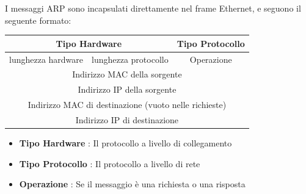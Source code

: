 \documentclass[12pt, letterpaper]{article}
\begin{document}
I messaggi ARP sono incapsulati direttamente nel frame Ethernet, e seguono il seguente formato: \begin{center}
    \begin{tabular}{|ccc|}
        \hline
        \multicolumn{2}{|c|}{Tipo Hardware}                                                  & Tipo Protocollo \\ \hline
        \multicolumn{1}{|c|}{lunghezza hardware} & \multicolumn{1}{c|}{lunghezza protocollo} & Operazione      \\ \hline
        \multicolumn{3}{|c|}{Indirizzo MAC della sorgente}                                                     \\ \hline
        \multicolumn{3}{|c|}{Indirizzo IP della sorgente}                                                      \\ \hline
        \multicolumn{3}{|c|}{Indirizzo MAC di destinazione (vuoto nelle richieste)}                            \\ \hline
        \multicolumn{3}{|c|}{Indirizzo IP di destinazione}                                                     \\ \hline
        \end{tabular}
\end{center}\begin{itemize}
    \item \textbf{Tipo Hardware} : Il protocollo a livello di collegamento
    \item \textbf{Tipo Protocollo} : Il protocollo a livello di rete
    \item \textbf{Operazione} : Se il messaggio è una richiesta o una risposta
\end{itemize}
\end{document}

